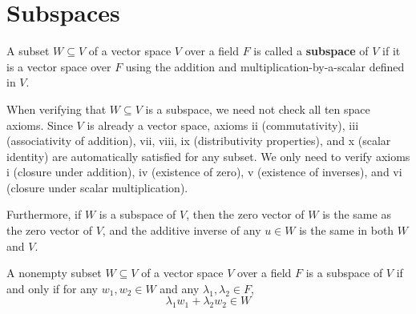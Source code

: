 \section{Subspaces}
\begin{definition}[Subspace]\label{def:subspace}
    A subset $W \subseteq V$ of a vector space $V$ over a field $F$ is called a \textbf{subspace} of $V$ if it is a vector space over $F$ using the addition and multiplication-by-a-scalar defined in $V$.
\end{definition}

\begin{note}
    When verifying that $W \subseteq V$ is a subspace, we need not check all ten space axioms. Since $V$ is already a vector space, axioms ii (commutativity), iii (associativity of addition), vii, viii, ix (distributivity properties), and x (scalar identity) are automatically satisfied for any subset. We only need to verify axioms i (closure under addition), iv (existence of zero), v (existence of inverses), and vi (closure under scalar multiplication).
    
    Furthermore, if $W$ is a subspace of $V$, then the zero vector of $W$ is the same as the zero vector of $V$, and the additive inverse of any $u \in W$ is the same in both $W$ and $V$.
\end{note}

\begin{theorem}\label{thm:subspace-test}
    A nonempty subset $W \subseteq V$ of a vector space $V$ over a field $F$ is a subspace of $V$ if and only if for any $w_1, w_2 \in W$ and any $\lambda_1, \lambda_2 \in F$,
    \[
    \lambda_1 w_1 + \lambda_2 w_2 \in W
    \]
\end{theorem}

